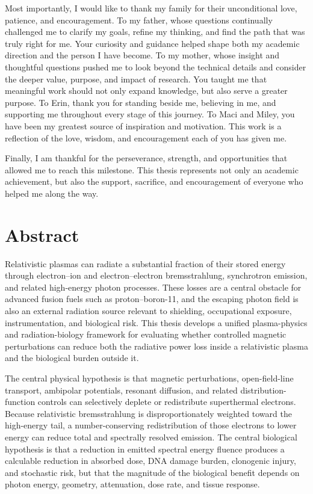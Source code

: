 \documentclass[12pt,oneside]{report}
\theoremstyle{definition}
\begin{document}
Most importantly, I would like to thank my family for their unconditional love, patience, and encouragement. To my father, whose questions continually challenged me to clarify my goals, refine my thinking, and find the path that was truly right for me. Your curiosity and guidance helped shape both my academic direction and the person I have become. To my mother, whose insight and thoughtful questions pushed me to look beyond the technical details and consider the deeper value, purpose, and impact of research. You taught me that meaningful work should not only expand knowledge, but also serve a greater purpose. To Erin, thank you for standing beside me, believing in me, and supporting me throughout every stage of this journey. To Maci and Miley, you have been my greatest source of inspiration and motivation. This work is a reflection of the love, wisdom, and encouragement each of you has given me.

Finally, I am thankful for the perseverance, strength, and opportunities that allowed me to reach this milestone. This thesis represents not only an academic achievement, but also the support, sacrifice, and encouragement of everyone who helped me along the way.

\clearpage

\chapter*{Abstract}
Relativistic plasmas can radiate a substantial fraction of their stored energy through electron--ion and electron--electron bremsstrahlung, synchrotron emission, and related high-energy photon processes. These losses are a central obstacle for advanced fusion fuels such as proton--boron-11, and the escaping photon field is also an external radiation source relevant to shielding, occupational exposure, instrumentation, and biological risk. This thesis develops a unified plasma-physics and radiation-biology framework for evaluating whether controlled magnetic perturbations can reduce both the radiative power loss inside a relativistic plasma and the biological burden outside it.

The central physical hypothesis is that magnetic perturbations, open-field-line transport, ambipolar potentials, resonant diffusion, and related distribution-function controls can selectively deplete or redistribute superthermal electrons. Because relativistic bremsstrahlung is disproportionately weighted toward the high-energy tail, a number-conserving redistribution of those electrons to lower energy can reduce total and spectrally resolved emission. The central biological hypothesis is that a reduction in emitted spectral energy fluence produces a calculable reduction in absorbed dose, DNA damage burden, clonogenic injury, and stochastic risk, but that the magnitude of the biological benefit depends on photon energy, geometry, attenuation, dose rate, and tissue response.
\end{document}
